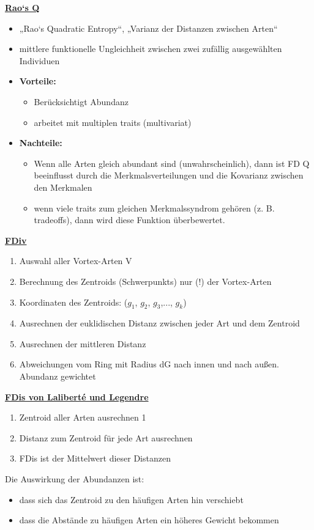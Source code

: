 \newpage
\underline{\textbf{Rao‘s Q}}
\begin{itemize}
	\item „Rao‘s Quadratic Entropy“, „Varianz der Distanzen zwischen Arten“
	\item mittlere funktionelle Ungleichheit zwischen zwei zufällig ausgewählten Individuen
	\item \textbf{Vorteile:}
	\begin{itemize}
		\item Berücksichtigt Abundanz
		\item arbeitet mit multiplen traits (multivariat)
	\end{itemize}
	\item \textbf{Nachteile:}
	\begin{itemize}
		\item Wenn alle Arten gleich abundant sind (unwahrscheinlich), dann ist FD Q beeinflusst durch die Merkmalsverteilungen und die Kovarianz zwischen den Merkmalen
		\item wenn viele traits zum gleichen Merkmalssyndrom gehören (z. B. tradeoffs), dann wird diese Funktion	überbewertet.
	\end{itemize}
\end{itemize}

\underline{\textbf{FDiv}}
\begin{enumerate}
	\item Auswahl aller Vortex-Arten V
	\item Berechnung des Zentroids (Schwerpunkts) nur (!) der Vortex-Arten
	\item Koordinaten des Zentroids: ($g_1$, $g_2$, $g_3$,..., $g_k$)
	\item Ausrechnen der euklidischen Distanz zwischen jeder Art und dem Zentroid
	\item Ausrechnen der mittleren Distanz
	\item Abweichungen vom Ring mit Radius dG nach innen und nach außen. Abundanz gewichtet
\end{enumerate}

\underline{\textbf{FDis von Laliberté und Legendre}}
\begin{enumerate}
	\item Zentroid aller Arten ausrechnen 1
	\item Distanz zum Zentroid für jede Art ausrechnen
	\item FDis ist der Mittelwert dieser Distanzen
\end{enumerate}

Die Auswirkung der Abundanzen ist:
\begin{itemize}
	\item dass sich das Zentroid zu den häufigen Arten hin verschiebt
	\item dass die Abstände zu häufigen Arten ein höheres Gewicht bekommen
\end{itemize}

